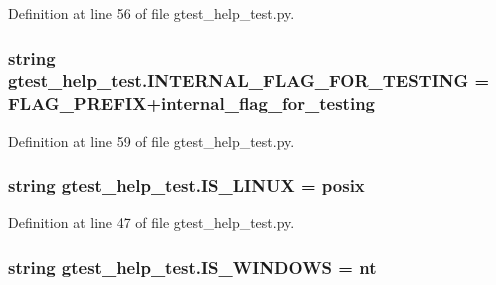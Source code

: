 Definition at line 56 of file gtest\+\_\+help\+\_\+test.\+py.

\subsubsection[{\texorpdfstring{I\+N\+T\+E\+R\+N\+A\+L\+\_\+\+F\+L\+A\+G\+\_\+\+F\+O\+R\+\_\+\+T\+E\+S\+T\+I\+NG}{INTERNAL_FLAG_FOR_TESTING}}]{\setlength{\rightskip}{0pt plus 5cm}string gtest\+\_\+help\+\_\+test.\+I\+N\+T\+E\+R\+N\+A\+L\+\_\+\+F\+L\+A\+G\+\_\+\+F\+O\+R\+\_\+\+T\+E\+S\+T\+I\+NG = {\bf F\+L\+A\+G\+\_\+\+P\+R\+E\+F\+IX}+\textquotesingle{}internal\+\_\+flag\+\_\+for\+\_\+testing\textquotesingle{}}\hypertarget{namespacegtest__help__test_aa7f487cde98f691eecc5f1f5e67c0a69}{}\label{namespacegtest__help__test_aa7f487cde98f691eecc5f1f5e67c0a69}


Definition at line 59 of file gtest\+\_\+help\+\_\+test.\+py.

\subsubsection[{\texorpdfstring{I\+S\+\_\+\+L\+I\+N\+UX}{IS_LINUX}}]{\setlength{\rightskip}{0pt plus 5cm}string gtest\+\_\+help\+\_\+test.\+I\+S\+\_\+\+L\+I\+N\+UX = \textquotesingle{}posix\textquotesingle{}}\hypertarget{namespacegtest__help__test_ae61a149d50be253176a139fbe6712582}{}\label{namespacegtest__help__test_ae61a149d50be253176a139fbe6712582}


Definition at line 47 of file gtest\+\_\+help\+\_\+test.\+py.

\subsubsection[{\texorpdfstring{I\+S\+\_\+\+W\+I\+N\+D\+O\+WS}{IS_WINDOWS}}]{\setlength{\rightskip}{0pt plus 5cm}string gtest\+\_\+help\+\_\+test.\+I\+S\+\_\+\+W\+I\+N\+D\+O\+WS = \textquotesingle{}nt\textquotesingle{}}\hypertarget{namespacegtest__help__test_a0f8d4b00fc83b1e72bbb5eca5f3bc4d7}{}\label{namespacegtest__help__test_a0f8d4b00fc83b1e72bbb5eca5f3bc4d7}


